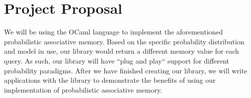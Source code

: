 \documentclass{sig-alternate}
\begin{document}





\section{Project Proposal}
\label{sec:project_proposal}
We will be using the OCaml language to implement the aforementioned probabilistic 
associative memory. Based on the specific probability distribution and model in use, our library would return 
a different memory value for each query. As such, our library will have ``plug and play`` support for 
different probability paradigms. After we have finished creating our library, we will 
write applications with the library to demonstrate the benefits of using our implementation
of probabilistic associative memory.
\end{document}
